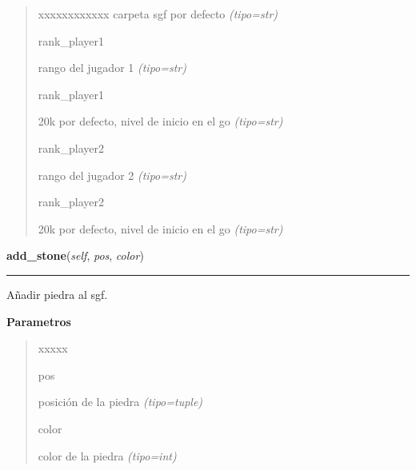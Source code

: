\begin{boxedminipage}{\funcwidth}
\begin{quote}
\begin{Ventry}{xxxxxxxxxxxx}
carpeta sgf por defecto
            {\it (tipo=str)}

          \item[rank\_player1]


rango del jugador 1
            {\it (tipo=str)}

          \item[rank\_player1]


20k por defecto, nivel de inicio en el go
            {\it (tipo=str)}

          \item[rank\_player2]


rango del jugador 2
            {\it (tipo=str)}

          \item[rank\_player2]


20k por defecto, nivel de inicio en el go
            {\it (tipo=str)}

        \end{Ventry}

      \end{quote}

    \end{boxedminipage}

    \label{src:kifu:Kifu:add_stone}

    \vspace{0.5ex}

\hspace{.8\funcindent}\begin{boxedminipage}{\funcwidth}

    \raggedright \textbf{add\_stone}(\textit{self}, \textit{pos}, \textit{color})

    \vspace{-1.5ex}

    \rule{\textwidth}{0.5\fboxrule}
\setlength{\parskip}{2ex}
Añadir piedra al sgf.

\setlength{\parskip}{1ex}
      \textbf{Parametros}
      \vspace{-1ex}

      \begin{quote}
        \begin{Ventry}{xxxxx}

          \item[pos]


posición de la piedra
            {\it (tipo=tuple)}

          \item[color]


color de la piedra
            {\it (tipo=int)}

        \end{Ventry}

      \end{quote}

    \end{boxedminipage}

